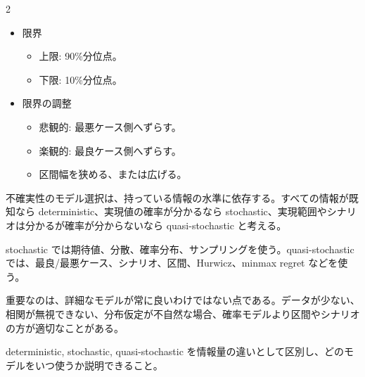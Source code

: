 \clearpage



\vspace{1.5mm}

\begin{multicols}{2}

\footnotesize

\raggedcolumns


\begin{itemize}
\item 限界
\begin{itemize}
\item 上限: 90\%分位点。
\item 下限: 10\%分位点。
\end{itemize}
\item 限界の調整
\begin{itemize}
\item 悲観的: 最悪ケース側へずらす。
\item 楽観的: 最良ケース側へずらす。
\item 区間幅を狭める、または広げる。
\end{itemize}
\end{itemize}

不確実性のモデル選択は、持っている情報の水準に依存する。すべての情報が既知なら deterministic、実現値の確率が分かるなら stochastic、実現範囲やシナリオは分かるが確率が分からないなら quasi-stochastic と考える。\par

stochastic では期待値、分散、確率分布、サンプリングを使う。quasi-stochastic では、最良/最悪ケース、シナリオ、区間、Hurwicz、minmax regret などを使う。\par

重要なのは、詳細なモデルが常に良いわけではない点である。データが少ない、相関が無視できない、分布仮定が不自然な場合、確率モデルより区間やシナリオの方が適切なことがある。\par

deterministic, stochastic, quasi-stochastic を情報量の違いとして区別し、どのモデルをいつ使うか説明できること。\par


\end{multicols}
